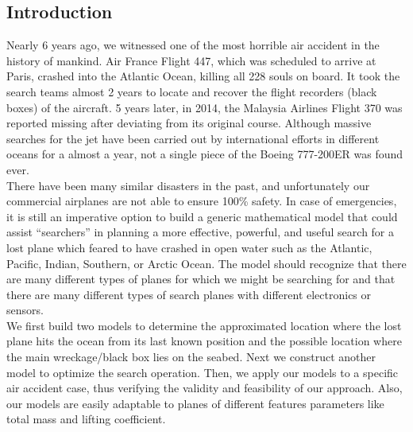 \documentclass[a4paper,11pt]{article}
\begin{document}
\begin{spacing}{1.0}
\begin{abstract}
\end{abstract}


\newpage
\section{Introduction}\label{Introduction}
Nearly 6 years ago, we witnessed one of the most horrible  air accident in the history of mankind. Air France Flight 447, which was scheduled to arrive at Paris, crashed into the Atlantic Ocean, killing all 228 souls on board. It took the search teams almost 2 years to locate and recover the flight recorders (black boxes) of the aircraft.\cite{af447} 5 years later, in 2014, the Malaysia Airlines Flight 370 was reported missing after deviating from its original course. Although massive searches for the jet have been carried out by international efforts in different oceans for a almost a year, not a single piece of the Boeing 777-200ER was found ever.
\\There have been many similar disasters in the past, and unfortunately our commercial airplanes are not able to ensure 100\% safety. In case of emergencies, it is still an imperative option to build a generic mathematical model that could assist ``searchers'' in planning a more effective, powerful, and useful search for a lost plane which feared to have crashed in open water such as the Atlantic, Pacific, Indian, Southern, or Arctic Ocean. The model should recognize that there are many different types of planes for which we might be searching for and that there are many different types of search planes with different electronics or sensors.
\\We first build two models to determine the approximated location where the lost plane hits the ocean from its last known position and the possible location where the main wreckage/black box lies on the seabed. Next we construct another model to optimize the search operation. Then, we apply our models to a specific air accident case, thus verifying the validity and feasibility of our approach. Also, our models are easily adaptable to planes of different features parameters like total mass and lifting coefficient.

\end{spacing}
\end{document}
